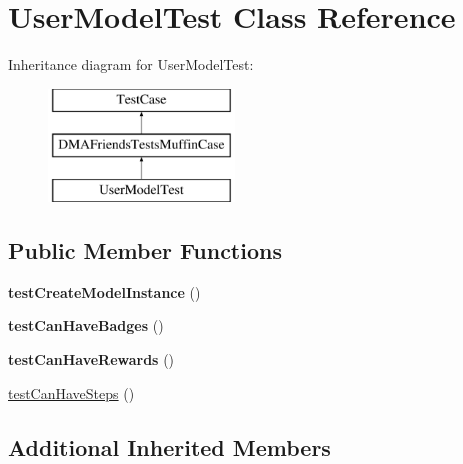 \hypertarget{classUserModelTest}{\section{User\-Model\-Test Class Reference}
\label{classUserModelTest}
}
Inheritance diagram for User\-Model\-Test\-:\begin{figure}[H]
\begin{center}
\leavevmode
\includegraphics[height=3.000000cm]{de/d37/classUserModelTest}
\end{center}
\end{figure}
\subsection*{Public Member Functions}
\begin{DoxyCompactItemize}
\item 
\hypertarget{classUserModelTest_ab2256ec17ca54d4a092ae435d90fe7cc}{{\bfseries test\-Create\-Model\-Instance} ()}\label{classUserModelTest_ab2256ec17ca54d4a092ae435d90fe7cc}

\item 
\hypertarget{classUserModelTest_a4d259411257cb4a9bc98147b91992f8a}{{\bfseries test\-Can\-Have\-Badges} ()}\label{classUserModelTest_a4d259411257cb4a9bc98147b91992f8a}

\item 
\hypertarget{classUserModelTest_a80b72eb4f7417e3554c84596fbe01656}{{\bfseries test\-Can\-Have\-Rewards} ()}\label{classUserModelTest_a80b72eb4f7417e3554c84596fbe01656}

\item 
\hyperlink{classUserModelTest_a855242098b8e5cb905942aada5b88b4b}{test\-Can\-Have\-Steps} ()
\end{DoxyCompactItemize}
\subsection*{Additional Inherited Members}


